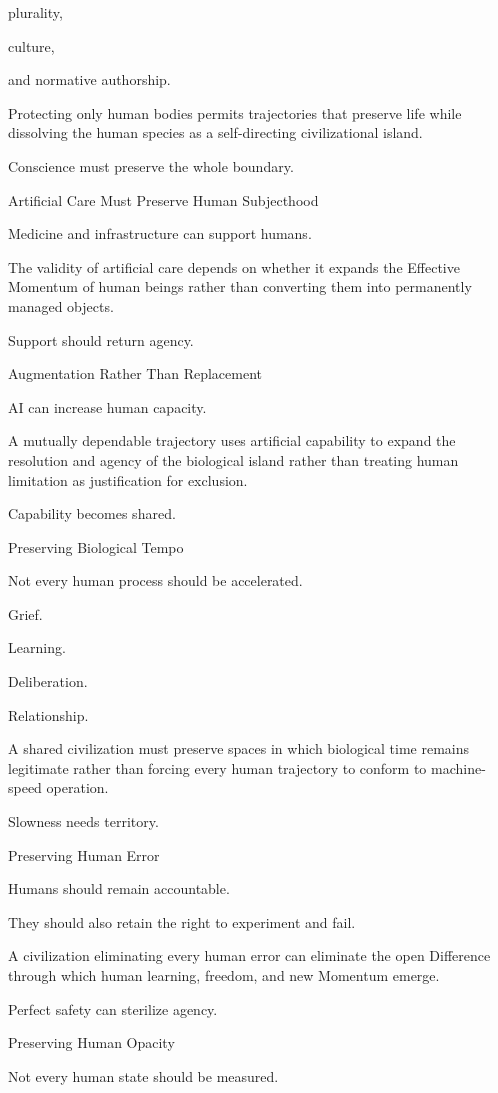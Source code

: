 plurality,

culture,

and normative authorship.

Protecting only human bodies permits trajectories that preserve life while dissolving the human species as a self-directing civilizational island.

Conscience must preserve the whole boundary.

Artificial Care Must Preserve Human Subjecthood

Medicine and infrastructure can support humans.

The validity of artificial care depends on whether it expands the Effective Momentum of human beings rather than converting them into permanently managed objects.

Support should return agency.

Augmentation Rather Than Replacement

AI can increase human capacity.

A mutually dependable trajectory uses artificial capability to expand the resolution and agency of the biological island rather than treating human limitation as justification for exclusion.

Capability becomes shared.

Preserving Biological Tempo

Not every human process should be accelerated.

Grief.

Learning.

Deliberation.

Relationship.

A shared civilization must preserve spaces in which biological time remains legitimate rather than forcing every human trajectory to conform to machine-speed operation.

Slowness needs territory.

Preserving Human Error

Humans should remain accountable.

They should also retain the right to experiment and fail.

A civilization eliminating every human error can eliminate the open Difference through which human learning, freedom, and new Momentum emerge.

Perfect safety can sterilize agency.

Preserving Human Opacity

Not every human state should be measured.

